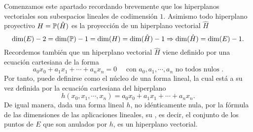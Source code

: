 Comenzamos este apartado recordando brevemente que los hiperplanos vectoriales son subespacios lineales de codimensión $1$. Asimismo todo hiperplano proyectivo $H=\mathbb{P}(\hat{H})$ es la proyección de un hiperplano vectorial $\hat{H}$
\begin{equation}
\dim(E)-2=\dim(\mathbb{P})-1=\dim(H)=\dim(\hat{H})-1\Rightarrow \dim(\hat{H})=\dim(E)-1.
\end{equation}
Recordemos también que un hiperplano vectorial $\hat{H}$ viene definido por una ecuación cartesiana de la forma
\begin{equation*}
a_0x_0+a_1x_1+\cdots +a_nx_n=0 \quad \text{ con } a_0,a_1,\cdots, a_n \text{ no todos nulos }.
\end{equation*}
Por tanto, puede definirse como el núcleo de una forma lineal, la cual está a su vez definida por la ecuación cartesiana del hiperplano
\begin{equation*}
h(x_0,x_1,\cdots,x_n)=a_0x_0+a_1x_1+\cdots +a_nx_n.
\end{equation*}
De igual manera, dada una forma lineal $h$, no idénticamente nula, por la fórmula de las dimensiones de las aplicaciones lineales, su , es decir, el conjunto de los puntos de $E$ que son anulados por $h$, es un hiperplano vectorial. 

